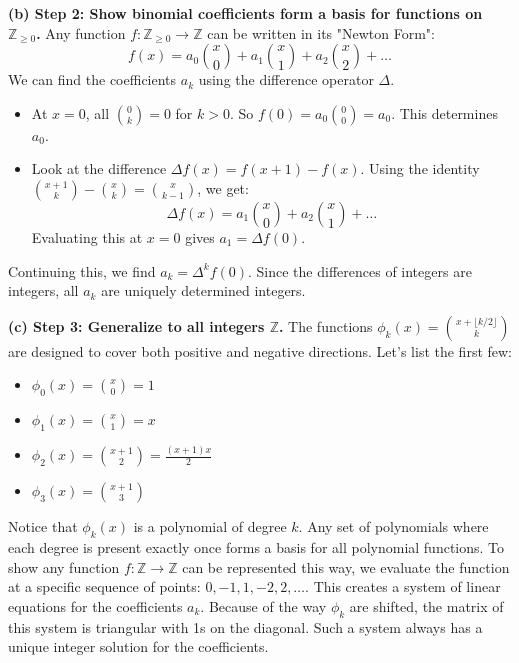 \begin{solution}
\textbf{(b) Step 2: Show binomial coefficients form a basis for functions on $\mathbb{Z}_{\geq 0}$.}
Any function $f: \mathbb{Z}_{\geq 0} \to \mathbb{Z}$ can be written in its "Newton Form":
\[ f(x) = a_0 \binom{x}{0} + a_1 \binom{x}{1} + a_2 \binom{x}{2} + \dots \]
We can find the coefficients $a_k$ using the difference operator $\Delta$.
\begin{itemize}
    \item At $x=0$, all $\binom{0}{k} = 0$ for $k > 0$. So $f(0) = a_0 \binom{0}{0} = a_0$. This determines $a_0$.
    \item Look at the difference $\Delta f(x) = f(x+1) - f(x)$. Using the identity $\binom{x+1}{k} - \binom{x}{k} = \binom{x}{k-1}$, we get:
    \[ \Delta f(x) = a_1 \binom{x}{0} + a_2 \binom{x}{1} + \dots \]
    Evaluating this at $x=0$ gives $a_1 = \Delta f(0)$.
\end{itemize}
Continuing this, we find $a_k = \Delta^k f(0)$. Since the differences of integers are integers, all $a_k$ are uniquely determined integers.

\textbf{(c) Step 3: Generalize to all integers $\mathbb{Z}$.}
The functions $\phi_k(x) = \binom{x + \lfloor k/2 \rfloor}{k}$ are designed to cover both positive and negative directions.
Let's list the first few:
\begin{itemize}
    \item $\phi_0(x) = \binom{x}{0} = 1$
    \item $\phi_1(x) = \binom{x}{1} = x$
    \item $\phi_2(x) = \binom{x+1}{2} = \frac{(x+1)x}{2}$
    \item $\phi_3(x) = \binom{x+1}{3}$
\end{itemize}
Notice that $\phi_k(x)$ is a polynomial of degree $k$. Any set of polynomials where each degree is present exactly once forms a basis for all polynomial functions.
To show any function $f: \mathbb{Z} \to \mathbb{Z}$ can be represented this way, we evaluate the function at a specific sequence of points: $0, -1, 1, -2, 2, \dots$.
This creates a system of linear equations for the coefficients $a_k$. Because of the way $\phi_k$ are shifted, the matrix of this system is triangular with 1s on the diagonal. Such a system always has a unique integer solution for the coefficients.
\end{solution}

